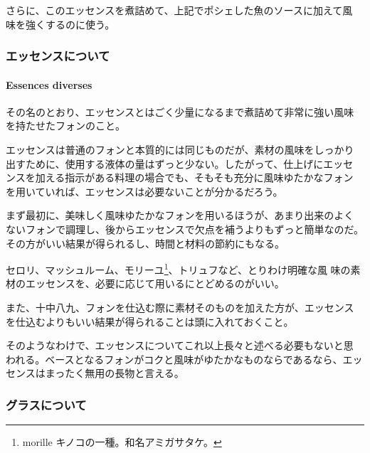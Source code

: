 \begin{recette}
さらに、このエッセンスを煮詰めて、上記でポシェした魚のソースに加えて風
味を強くするのに使う。

\maeaki

\hypertarget{essencesdiverses}{%
\subsubsection{エッセンスについて}\label{essencesdiverses}}

\hypertarget{essences-diverses}{%
\paragraph{Essences diverses}\label{essences-diverses}}


その名のとおり、エッセンスとはごく少量になるまで煮詰めて非常に強い風味
を持たせたフォンのこと。

エッセンスは普通のフォンと本質的には同じものだが、素材の風味をしっかり
出すために、使用する液体の量はずっと少ない。したがって、仕上げにエッセ
ンスを加える指示がある料理の場合でも、そもそも充分に風味ゆたかなフォン
を用いていれば、エッセンスは必要ないことが分かるだろう。

まず最初に、美味しく風味ゆたかなフォンを用いるほうが、あまり出来のよく
ないフォンで調理し、後からエッセンスで欠点を補うよりもずっと簡単なのだ。
その方がいい結果が得られるし、時間と材料の節約にもなる。

セロリ、マッシュルーム、モリーユ\footnote{morille
  キノコの一種。和名アミガサタケ。}、トリュフなど、とりわけ明確な風
味の素材のエッセンスを、必要に応じて用いるにとどめるのがいい。

また、十中八九、フォンを仕込む際に素材そのものを加えた方が、エッセンス
を仕込むよりもいい結果が得られることは頭に入れておくこと。

そのようなわけで、エッセンスについてこれ以上長々と述べる必要もないと思
われる。ベースとなるフォンがコクと風味がゆたかなものならであるなら、エッ
センスはまったく無用の長物と言える。

\maeaki

\hypertarget{glacesdiverses}{%
\subsubsection{グラスについて}\label{glacesdiverses}}

\hypertarget{glaces-diverses}{%
}
\end{recette}
